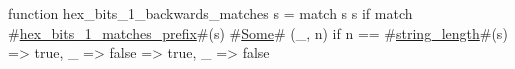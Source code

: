 function hex_bits_1_backwards_matches s = match s {
  s if match #\hyperref[sailRISCVzhexzybitszy1zymatcheszyprefix]{hex\_bits\_1\_matches\_prefix}#(s) {
    #\hyperref[sailRISCVzSome]{Some}# (_, n) if n == #\hyperref[sailRISCVzstringzylength]{string\_length}#(s) => true,
    _ => false
  } => true,
  _ => false
}

